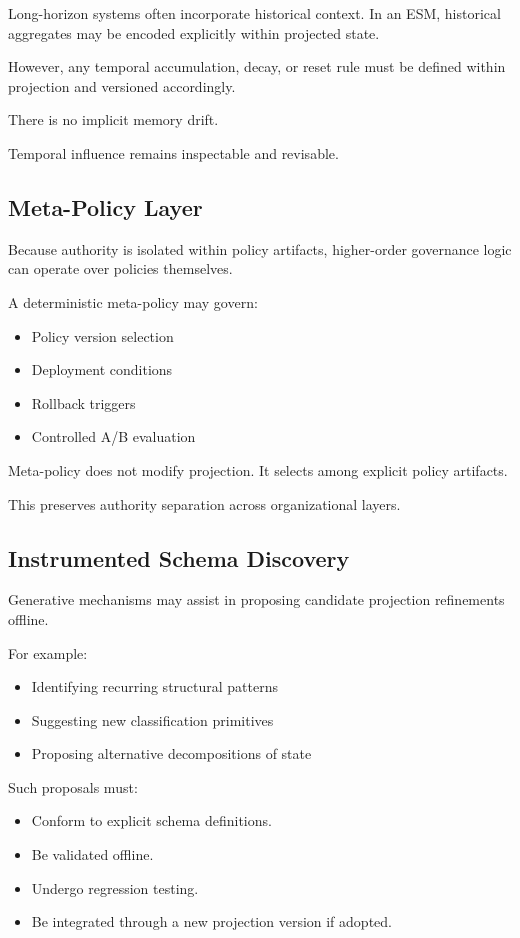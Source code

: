 \documentclass[11pt]{article}
\begin{document}
Long-horizon systems often incorporate historical context. In an ESM, historical aggregates may be encoded explicitly within projected state.

However, any temporal accumulation, decay, or reset rule must be defined within projection and versioned accordingly.

There is no implicit memory drift.

Temporal influence remains inspectable and revisable.


\subsection{Meta-Policy Layer}

Because authority is isolated within policy artifacts, higher-order governance logic can operate over policies themselves.

A deterministic meta-policy may govern:

\begin{itemize}
  \item Policy version selection
  \item Deployment conditions
  \item Rollback triggers
  \item Controlled A/B evaluation
\end{itemize}

Meta-policy does not modify projection. It selects among explicit policy artifacts.

This preserves authority separation across organizational layers.


\subsection{Instrumented Schema Discovery}

Generative mechanisms may assist in proposing candidate projection refinements offline.

For example:

\begin{itemize}
  \item Identifying recurring structural patterns
  \item Suggesting new classification primitives
  \item Proposing alternative decompositions of state
\end{itemize}

Such proposals must:

\begin{itemize}
  \item Conform to explicit schema definitions.
  \item Be validated offline.
  \item Undergo regression testing.
  \item Be integrated through a new projection version if adopted.
\end{itemize}
\end{document}
